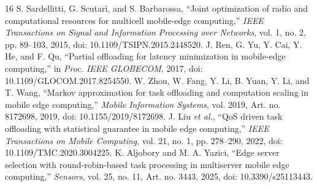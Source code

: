 \documentclass[conference]{IEEEtran}
\begin{document}
\begin{thebibliography}{16}
     S. Sardellitti, G. Scutari, and S. Barbarossa, ``Joint optimization of radio and computational resources for multicell mobile-edge computing,'' \emph{IEEE Transactions on Signal and Information Processing over Networks}, vol. 1, no. 2, pp. 89--103, 2015, doi: 10.1109/TSIPN.2015.2448520.
     J. Ren, G. Yu, Y. Cai, Y. He, and F. Qu, ``Partial offloading for latency minimization in mobile-edge computing,'' in \emph{Proc. IEEE GLOBECOM}, 2017, doi: 10.1109/GLOCOM.2017.8254550.
     W. Zhou, W. Fang, Y. Li, B. Yuan, Y. Li, and T. Wang, ``Markov approximation for task offloading and computation scaling in mobile edge computing,'' \emph{Mobile Information Systems}, vol. 2019, Art. no. 8172698, 2019, doi: 10.1155/2019/8172698.
     J. Liu \emph{et al.}, ``QoS driven task offloading with statistical guarantee in mobile edge computing,'' \emph{IEEE Transactions on Mobile Computing}, vol. 21, no. 1, pp. 278--290, 2022, doi: 10.1109/TMC.2020.3004225.
     K. Aljobory and M. A. Yazici, ``Edge server selection with round-robin-based task processing in multiserver mobile edge computing,'' \emph{Sensors}, vol. 25, no. 11, Art. no. 3443, 2025, doi: 10.3390/s25113443.
        \end{thebibliography}

        
\end{document}
